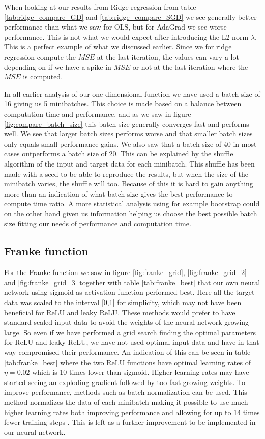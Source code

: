 \documentclass[11pt]{article}
\begin{document}
When looking at our results from Ridge regression from table \ref{tab:ridge_compare_GD} and \ref{tab:ridge_compare_SGD} we see generally better performance than what we saw for OLS, but for AdaGrad we see worse performance. This is not what we would expect after introducing the L2-norm $\lambda$. This is a perfect example of what we discussed earlier. Since we for ridge regression compute the $MSE$ at the last iteration, the values can vary a lot depending on if we have a spike in $MSE$ or not at the last iteration where the $MSE$ is computed.


In all earlier analysis of our one dimensional function we have used a batch size of 16 giving us 5 minibatches. This choice is made based on a balance between computation time and performance, and as we saw in figure \ref{fig:compare_batch_size} this batch size generally converges fast and performs well. We see that larger batch sizes performs worse and that smaller batch sizes only equals small performance gains. We also saw that a batch size of 40 in most cases outperforms a batch size of 20. This can be explained by the shuffle algorithm of the input and target data for each minibatch. This shuffle has been made with a seed to be able to reproduce the results, but when the size of the minibatch varies, the shuffle will too. Because of this it is hard to gain anything more than an indication of what batch size gives the best performance to compute time ratio. A more statistical analysis using for example bootstrap could on the other hand given us information helping us choose the best possible batch size fitting our needs of performance and computation time.

\subsection{Franke function}
For the Franke function we saw in figure \ref{fig:franke_grid}, \ref{fig:franke_grid_2} and \ref{fig:franke_grid_3} together with table \ref{tab:franke_best} that our own neural network using sigmoid as activation function performed best. Here all the target data was scaled to the interval [0,1] for simplicity, which may not have been beneficial for ReLU and leaky ReLU. These methods would prefer to have standard scaled input data \cite{deeplearning} to avoid the weights of the neural network growing large. So even if we have performed a grid search finding the optimal parameters for ReLU and leaky ReLU, we have not used optimal input data and have in that way compromised their performance. An indication of this can be seen in table \ref{tab:franke_best} where the two ReLU functions have optimal learning rates of $\eta=0.02$ which is 10 times lower than sigmoid. Higher learning rates may have started seeing an exploding gradient followed by too fast-growing weights. To improve performance, methods such as batch normalization can be used. This method normalizes the data of each minibatch making it possible to use much higher learning rates both improving performance and allowing for up to 14 times fewer training steps \cite{batchnormalization}. This is left as a further improvement to be implemented in our neural network.
\end{document}

